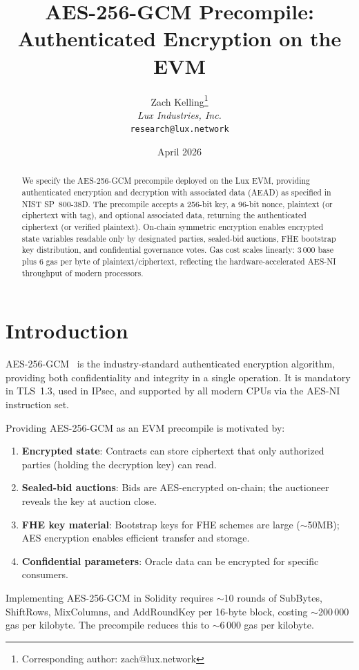 \documentclass[11pt,a4paper]{article}
\title{AES-256-GCM Precompile:\\Authenticated Encryption on the EVM}
\author{
Zach Kelling\thanks{Corresponding author: zach@lux.network}\\
\textit{Lux Industries, Inc.}\\
\texttt{research@lux.network}
}
\date{April 2026}
\begin{document}
\luxcoverpage

\begin{abstract}
We specify the AES-256-GCM precompile deployed on the Lux EVM, providing
authenticated encryption and decryption with associated data (AEAD) as specified
in NIST SP~800-38D. The precompile accepts a 256-bit key, a 96-bit nonce,
plaintext (or ciphertext with tag), and optional associated data, returning the
authenticated ciphertext (or verified plaintext). On-chain symmetric encryption
enables encrypted state variables readable only by designated parties, sealed-bid
auctions, FHE bootstrap key distribution, and confidential governance votes.
Gas cost scales linearly: 3\,000 base plus 6 gas per byte of plaintext/ciphertext,
reflecting the hardware-accelerated AES-NI throughput of modern processors.
\end{abstract}

\section{Introduction}

AES-256-GCM~\cite{sp800-38d} is the industry-standard authenticated encryption
algorithm, providing both confidentiality and integrity in a single operation.
It is mandatory in TLS~1.3, used in IPsec, and supported by all modern CPUs
via the AES-NI instruction set.

Providing AES-256-GCM as an EVM precompile is motivated by:
\begin{enumerate}[label=(\roman*)]
  \item \textbf{Encrypted state}: Contracts can store ciphertext that only
    authorized parties (holding the decryption key) can read.
  \item \textbf{Sealed-bid auctions}: Bids are AES-encrypted on-chain; the
    auctioneer reveals the key at auction close.
  \item \textbf{FHE key material}: Bootstrap keys for FHE schemes are large
    ($\sim$50MB); AES encryption enables efficient transfer and storage.
  \item \textbf{Confidential parameters}: Oracle data can be encrypted for
    specific consumers.
\end{enumerate}

Implementing AES-256-GCM in Solidity requires $\sim$10 rounds of SubBytes,
ShiftRows, MixColumns, and AddRoundKey per 16-byte block, costing $\sim$200\,000
gas per kilobyte. The precompile reduces this to $\sim$6\,000 gas per kilobyte.
\end{document}
